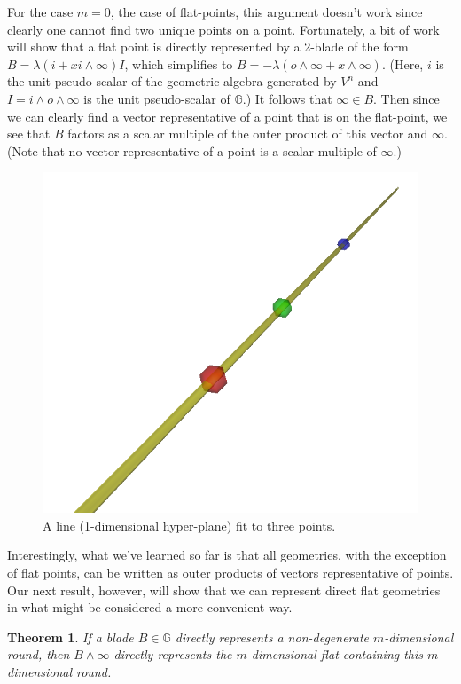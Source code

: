 \documentclass[12pt]{article}
\newcommand{\G}{\mathbb{G}}
\newcommand{\nvao}{o}
\newcommand{\nvai}{\infty}
\newtheorem{theorem}{Theorem}[section]
\begin{document}
For the case $m=0$, the case of flat-points, this argument doesn't work since clearly
one cannot find two unique points on a point.  Fortunately, a bit of work will show
that a flat point is directly represented by a 2-blade of the form $B=\lambda(i+xi\wedge\nvai)I$,
which simplifies to $B=-\lambda(\nvao\wedge\nvai+x\wedge\nvai)$.  (Here, $i$ is
the unit pseudo-scalar of the geometric algebra generated by $V^n$ and $I=i\wedge\nvao\wedge\nvai$ is
the unit pseudo-scalar of $\G$.)  It follows that
$\nvai\in B$.  Then since we can clearly find a vector representative of a point
that is on the flat-point, we see that $B$ factors as a scalar multiple of the outer
product of this vector and $\nvai$.  (Note that no vector representative of a point
is a scalar multiple of $\nvai$.)
\begin{figure}[H]
\centering
\includegraphics[scale=0.3]{DirectLineFigure}
\caption{A line (1-dimensional hyper-plane) fit to three points.}
\end{figure}
Interestingly, what we've learned so far is that all geometries,
with the exception of flat points, can be written as outer products
of vectors representative of points.  Our next result, however, will
show that we can represent direct flat geometries in what might be
considered a more convenient way.
\begin{theorem}\label{thm_round_to_flat}
If a blade $B\in\G$ directly represents a non-degenerate $m$-dimensional round,
then $B\wedge\nvai$ directly represents the $m$-dimensional flat
containing this $m$-dimensional round.
\end{theorem}
\end{document}
